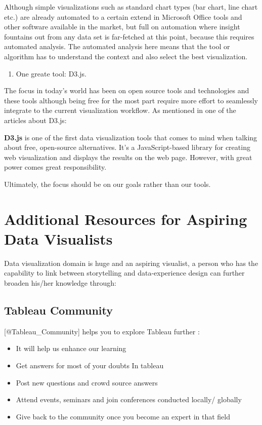 \documentclass[]{book}
\providecommand{\tightlist}{%
  \setlength{\itemsep}{0pt}\setlength{\parskip}{0pt}}
\theoremstyle{definition}
\theoremstyle{definition}
\theoremstyle{definition}
\theoremstyle{remark}
\begin{document}
Although simple visualizations such as standard chart types (bar chart,
line chart etc.) are already automated to a certain extend in Microsoft
Office tools and other software available in the market, but full on
automation where insight fountains out from any data set is far-fetched
at this point, because this requires automated analysis. The automated
analysis here means that the tool or algorithm has to understand the
context and also select the best visualization.

\begin{enumerate}
\def\labelenumi{\arabic{enumi}.}
\setcounter{enumi}{5}
\tightlist
\item
  One greate tool: D3.js.
\end{enumerate}

The focus in today's world has been on open source tools and
technologies and these tools although being free for the most part
require more effort to seamlessly integrate to the current visualization
workflow. As mentioned in one of the articles about D3.js:

\textbf{D3.js} is one of the first data visualization tools that comes
to mind when talking about free, open-source alternatives. It's a
JavaScript-based library for creating web visualization and displays the
results on the web page. However, with great power comes great
responsibility.

Ultimately, the focus should be on our goals rather than our tools.

\section{Additional Resources for Aspiring Data
Visualists}\label{additional-resources-for-aspiring-data-visualists}

Data visualization domain is huge and an aspiring visualist, a person
who has the capability to link between storytelling and data-experience
design can further broaden his/her knowledge through:

\subsection{Tableau Community}\label{tableau-community}

{[}@Tableau\_Community{]} helps you to explore Tableau further :

\begin{itemize}
\tightlist
\item
  It will help us enhance our learning
\item
  Get answers for most of your doubts In tableau
\item
  Post new questions and crowd source answers
\item
  Attend events, seminars and join conferences conducted locally/
  globally
\item
  Give back to the community once you become an expert in that field
\end{itemize}
\end{document}
